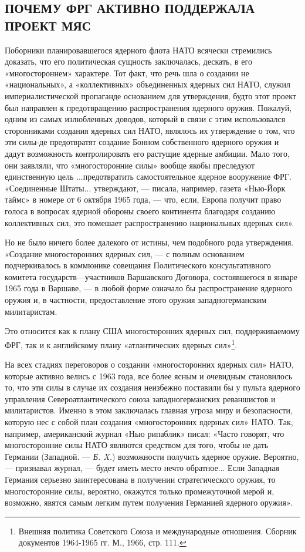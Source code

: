 \documentclass[12pt, a4paper, openany]{book}
\begin{document}
	\subsection[Почему ФРГ активно поддержала проект МЯС]{\center ПОЧЕМУ ФРГ АКТИВНО ПОДДЕРЖАЛА ПРОЕКТ МЯС}
	
	
	Поборники планировавшегося ядерного флота НАТО всячески стремились доказать, что его политическая сущность заключалась, дескать, в его «многостороннем» характере. Тот факт, что речь шла о создании не «национальных», а «коллективных» объединенных ядерных сил НАТО, служил империалистической пропаганде основанием для утверждения, будто этот проект был направлен к предотвращению распространения ядерного оружия. Пожалуй, одним из самых излюбленных доводов, который в связи с этим использовался сторонниками создания ядерных сил НАТО, являлось их утверждение о том, что эти силы-де предотвратят создание Бонном собственного ядерного оружия и дадут возможность контролировать его растущие ядерные амбиции. Мало того, они заявляли, что «многосторонние силы» вообще якобы преследуют единственную цель ...предотвратить самостоятельное ядерное вооружение ФРГ. «Соединенные Штаты... утверждают, — писала, например, газета «Нью-Йорк таймс» в номере от 6 октября 1965 года, — что, если, Европа получит право голоса в вопросах ядерной обороны своего континента благодаря созданию коллективных сил, это помешает распространению национальных ядерных сил».
		
	
	Но не было ничего более далекого от истины, чем подобного рода утверждения. «Создание многосторонних ядерных сил, — с полным основанием подчеркивалось в коммюнике совещания Политического консультативного комитета государств—участников Варшавского Договора, состоявшегося в январе 1965 года в Варшаве, — в любой форме означало бы распространение ядерного оружия и, в частности, предоставление этого оружия западногерманским милитаристам.
	
	Это относится как к плану США многосторонних ядерных сил, поддерживаемому ФРГ, так и к английскому плану «атлантических ядерных сил»{\footnote{Внешняя политика Советского Союза и международные отношения. Сборник документов 1964-1965 гг. М., 1966, стр. 111.
	}}.
	
На всех стадиях переговоров о создании «многосторонних ядерных сил» НАТО, которые активно велись с 1963 года, все более ясным и очевидным становилось то, что эти силы в случае их создания неизбежно поставили бы у пульта ядерного управления Североатлантического союза западногерманских реваншистов и милитаристов. Именно в этом заключалась главная угроза миру и безопасности, которую нес с собой план создания «многосторонних ядерных сил» НАТО. Так, например, американский журнал «Нью рипаблик» писал: «Часто говорят, что многосторонние силы НАТО являются средством для того, чтобы не дать Германии (Западной. — \textit{Б. X.}) возможности получить ядерное оружие. Вероятно, — признавал журнал, — будет иметь место нечто обратное... Если Западная Германия серьезно заинтересована в получении стратегического оружия, то многосторонние силы, вероятно, окажутся только промежуточной мерой и, возможно, явятся самым легким путем получения Германией ядерного оружия».
	
\end{document}
